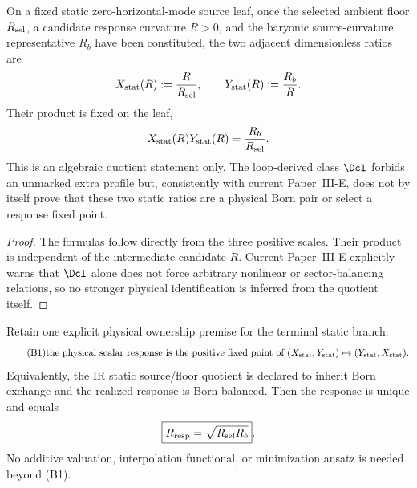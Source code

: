 \documentclass[12pt,a4paper]{article}
\begin{document}
\begin{lemma}
\label{p8:lem:terminal-static-d1-quotient}
On a fixed static zero-horizontal-mode source leaf, once the selected ambient
floor \(R_{\rm sel}\), a candidate response curvature \(R>0\), and the
baryonic source-curvature representative \(R_b\) have been constituted, the
two adjacent dimensionless ratios are
\begin{equation}
\label{p8:eq:terminal-static-forced-quotient}
X_{\rm stat}(R):=\frac{R}{R_{\rm sel}},
\qquad
Y_{\rm stat}(R):=\frac{R_b}{R}.
\end{equation}
Their product is fixed on the leaf,
\begin{equation}
X_{\rm stat}(R)Y_{\rm stat}(R)=\frac{R_b}{R_{\rm sel}}.
\end{equation}
This is an algebraic quotient statement only.  The loop-derived class
\(\Dcl\) forbids an unmarked extra profile but, consistently with current
Paper~III-E, does not by itself prove that these two static ratios are a
physical Born pair or select a response fixed point.
\end{lemma}

\begin{proof}
The formulas follow directly from the three positive scales.  Their product is
independent of the intermediate candidate \(R\).  Current Paper~III-E
explicitly warns that \(\Dcl\) alone does not force arbitrary nonlinear or
sector-balancing relations, so no stronger physical identification is inferred
from the quotient itself.
\end{proof}

\begin{theorem}
\label{p8:prop:unique-terminal-geomean}
Retain one explicit physical ownership premise for the terminal static branch:
\begin{equation}
\label{p8:eq:B1-ir-born-balance}
\tag{B1}
\text{the physical scalar response is the positive fixed point of }
(X_{\rm stat},Y_{\rm stat})\mapsto(Y_{\rm stat},X_{\rm stat}).
\end{equation}
Equivalently, the IR static source/floor quotient is declared to inherit Born
exchange and the realized response is Born-balanced.  Then the response is
unique and equals
\begin{equation}
\label{p8:eq:forced-response-geomean}
\boxed{R_{\rm resp}=\sqrt{R_{\rm sel}R_b}}.
\end{equation}
No additive valuation, interpolation functional, or minimization ansatz is
needed beyond (B1).
\end{theorem}
\end{document}
